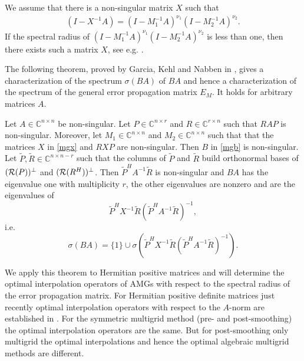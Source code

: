 \documentclass[final]{siamltex}
\newcommand{\innCnn}{\in\mathbb{C}^{n\times n}}
\newcommand{\innCrn}{\in\mathbb{C}^{r\times n}}
\newcommand{\innCnr}{\in\mathbb{C}^{n\times r}}
\newcommand{\beqo}{\begin{eqnarray*}}
\newcommand{\beq}{\begin{eqnarray}}
\newcommand{\eeqo}{\end{eqnarray*}}
\newcommand{\eeq}{\end{eqnarray}}
\numberwithin{equation}{section}
\newcommand{\im} {{\cal R}}
\newcommand{\bC}{\mathbb{C}}
\begin{document}

We assume that there is a
non-singular matrix $X$ such that
\beq \label{mgx}
(I-X^{-1}A) = (I-M_1^{-1}A)^{\nu_1}(I-M_2^{-1}A)^{\nu_2}.
\eeq
If the spectral radius of $
(I-M_1^{-1}A)^{\nu_1}(I-M_2^{-1}A)^{\nu_2}$ is less  than one, then  there
exists such a
matrix  $X$, see e.g. \cite{BenS97}.

The following theorem, proved by Garcia, Kehl  and Nabben in \cite{GarKN18},  gives a characterization of the spectrum $\sigma(BA)$ of $BA$ and hence a characterization of the spectrum of the general error propagation matrix $E_M$. It holds  for arbitrary matrices $A$. 


\begin{theorem} \label{theo:mg:eig}
Let $A \innCnn$ be  non-singular. Let   $P \innCnr $ and  $R \innCrn $ such
that $RAP$ is non-singular. Moreover, let $M_1 \innCnn$ and $M_2 \innCnn $
such  that  that the matrices $X$ in \eqref{mgx} and $RXP$ are  non-singular.
Then $B$ in
\eqref{mgb}  is non-singular. Let $\tilde P, \tilde R \in \bC^{n \times n-r}$ such that the columns  of
$\tilde P$ and $\tilde R $  build  orthonormal  bases of $(\im (P))^\perp$ and
$(\im (R^{H}))^\perp$. Then  $\tilde P^HA^{-1}\tilde R$ is non-singular and $BA$  has the eigenvalue one  with multiplicity $r$, the other eigenvalues are
nonzero and are   the eigenvalues of 
\[
\tilde P^HX^{-1}\tilde R (\tilde P^HA^{-1}\tilde R)^{-1}, 
\]
i.e.
\[
\sigma(BA) = \{1\} \cup \sigma(\tilde P^HX^{-1}\tilde R (\tilde P^HA^{-1}\tilde R)^{-1}). 
\]
\end{theorem}

We apply this   theorem to  Hermitian positive  matrices and will 
determine the  optimal interpolation operators of AMGs with respect to the spectral radius of the error propagation matrix.  
For Hermitian  positive definite 
matrices just recently optimal interpolation  operators with respect to the $A$-norm are established in \cite{XuZ17, Bra18}.
 For the symmetric multigrid method (pre- and  post-smoothing) the optimal interpolation operators are  the same. But for post-smoothing only multigrid the optimal interpolations and hence the optimal algebraic multigrid methods are  different.
\end{document}
